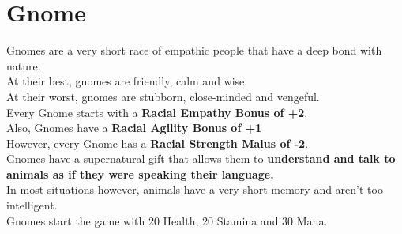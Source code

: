 \section{Gnome}\label{race:gnome}
Gnomes are a very short race of empathic people that have a deep bond with nature.\\
At their best, gnomes are friendly, calm and wise.\\
At their worst, gnomes are stubborn, close-minded and vengeful.\\
Every Gnome starts with a \textbf{Racial Empathy Bonus of +2}.\\
Also, Gnomes have a \textbf{Racial Agility Bonus of +1}\\
However, every Gnome has a \textbf{Racial Strength Malus of -2}.\\
Gnomes have a supernatural gift that allows them to \textbf{understand and talk to animals as if they were speaking their language.}\\
In most situations however, animals have a very short memory and aren't too intelligent.\\
Gnomes start the game with 20 Health, 20 Stamina and 30 Mana.